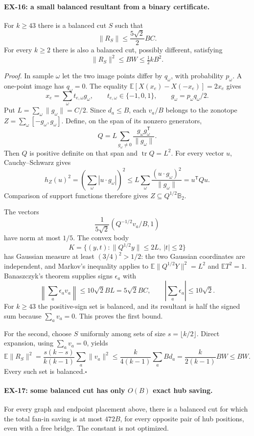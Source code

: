 \paragraph{EX-16: a small balanced resultant from a binary certificate.}
For $k\geq43$ there is a balanced cut $S$ such that
\[
 \|R_S\|\leq \frac{5\sqrt2}{2}BC.
\]
For every $k\geq2$ there is also a balanced cut, possibly different, satisfying
\[
 \|R_S\|^2\leq BW\leq \tfrac12 kB^2.
\]

\emph{Proof.}
In sample $\omega$ let the two image points differ by $q_\omega$, with
probability $p_\omega$.  A one-point image has $q_\omega=0$.  The equality
$\mathbb E[X(x_e)-X(-x_e)]=2x_e$ gives
\[
 x_e=\sum_\omega t_{e,\omega}g_\omega,
 \qquad t_{e,\omega}\in\{-1,0,1\},
 \qquad g_\omega=p_\omega q_\omega/2.
\]
Put $L=\sum_\omega\|g_\omega\|=C/2$.  Since $d_a\leq B$, each $v_a/B$
belongs to the zonotope $Z=\sum_\omega[-g_\omega,g_\omega]$.  Define, on the
span of its nonzero generators,
\[
 Q=L\sum_{g_\omega\ne0}
       \frac{g_\omega g_\omega^{\mathsf T}}{\|g_\omega\|}.
\]
Then $Q$ is positive definite on that span and $\operatorname{tr}Q=L^2$.
For every vector $u$, Cauchy--Schwarz gives
\[
 h_Z(u)^2=\left(\sum_\omega|u\cdot g_\omega|\right)^2
 \leq L\sum_\omega\frac{(u\cdot g_\omega)^2}{\|g_\omega\|}
 =u^{\mathsf T}Qu.
\]
Comparison of support functions therefore gives
$Z\subseteq Q^{1/2}\mathbb B_2$.

The vectors
\[
 \frac{1}{5\sqrt2}\left(Q^{-1/2}v_a/B,1\right)
\]
have norm at most $1/5$.  The convex body
\[
 K=\{(y,t):\|Q^{1/2}y\|\leq2L,\ |t|\leq2\}
\]
has Gaussian measure at least $(3/4)^2>1/2$: the two Gaussian coordinates
are independent, and Markov's inequality applies to
$\mathbb E\|Q^{1/2}Y\|^2=L^2$ and $\mathbb ET^2=1$.
Banaszczyk's theorem supplies signs $\epsilon_a$ with
\[
 \left\|\sum_a\epsilon_a v_a\right\|
       \leq10\sqrt2 BL=5\sqrt2 BC,
 \qquad \left|\sum_a\epsilon_a\right|\leq10\sqrt2.
\]
For $k\geq43$ the positive-sign set is balanced, and its resultant is half
the signed sum because $\sum_a v_a=0$.  This proves the first bound.

For the second, choose $S$ uniformly among sets of size
$s=\lfloor k/2\rfloor$.  Direct expansion, using $\sum_a v_a=0$, yields
\[
 \mathbb E\|R_S\|^2
 =\frac{s(k-s)}{k(k-1)}\sum_a\|v_a\|^2
 \leq\frac{k}{4(k-1)}\sum_a B d_a
 =\frac{k}{2(k-1)}BW\leq BW.
\]
Every such set is balanced.\hfill$\square$

\paragraph{EX-17: some balanced cut has only $O(B)$ exact hub saving.}
For every graph and endpoint placement above, there is a balanced cut for
which the total fan-in saving is at most $472B$, for every opposite pair of
hub positions, even with a free bridge.  The constant is not optimized.

